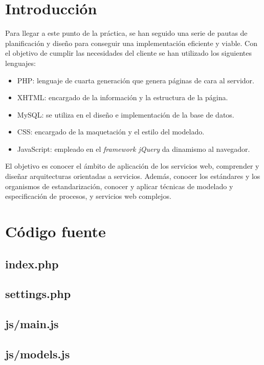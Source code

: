 \documentclass[11pt,a4paper,spanish,twoside]{book}
\begin{document}
\section{Introducción}
Para llegar a este punto de la práctica, se han seguido una serie de pautas de
planificación y diseño para conseguir una implementación eficiente y viable.
Con el objetivo de cumplir las necesidades del cliente se han utilizado los
siguientes lenguajes:
\begin{itemize}
\item PHP\cite{achour}: lenguaje de cuarta generación que genera páginas de cara
al servidor.
\item XHTML\cite{wc}: encargado de la información y la estructura de la página.
\item MySQL: se utiliza en el diseño e implementación de la base de datos.
\item CSS\cite{wc}: encargado de la maquetación y el estilo del modelado.
\item JavaScript\cite{resig}: empleado en el \emph{framework jQuery} da 
dinamismo al navegador.
\end{itemize} 
El objetivo es conocer el ámbito de aplicación de los servicios web, comprender 
y diseñar arquitecturas orientadas a servicios. Además, conocer los estándares y
los organismos de estandarización, conocer y aplicar técnicas de modelado y 
especificación de procesos, y servicios web complejos.

\section{Código fuente}
\subsection{index.php}
%

\subsection{settings.php}
%

\subsection{js/main.js}
%

\subsection{js/models.js}
%
\end{document}
